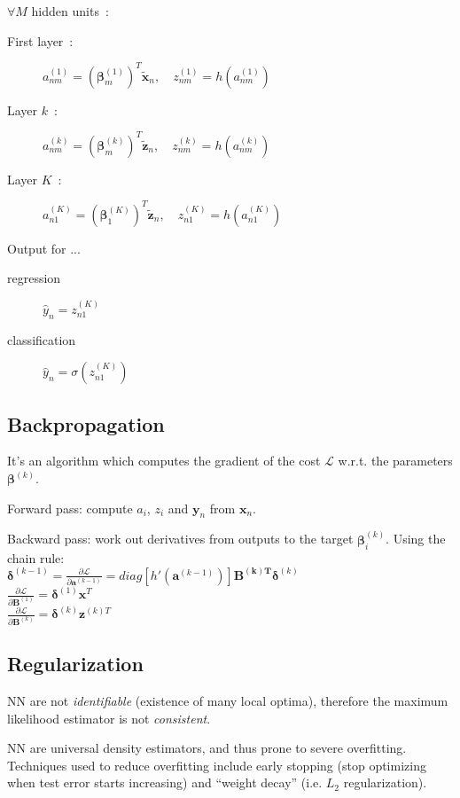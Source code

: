 \documentclass[10pt,a4paper,landscape]{article}
\renewcommand{\bf}[1]{\ensuremath{\mathbf{#1}}}
\newcommand{\bbeta}{\boldsymbol\beta}
\newcommand{\bdelta}{\boldsymbol\delta}
\begin{document}
\begin{multicols*}{4}
$\forall M$ hidden units~:
\begin{description}
\item[First layer~:] $a_{nm}^{(1)} = (\bbeta_m^{(1)})^T\tilde{\bf{x}}_n, \quad z_{nm}^{(1)} = h(a_{nm}^{(1)})$
\item[Layer $k$~:] $a_{nm}^{(k)} = (\bbeta_m^{(k)})^T\tilde{\bf{z}}_n, \quad z_{nm}^{(k)} = h(a_{nm}^{(k)})$
\item[Layer $K$~:] $a_{n1}^{(K)} = (\bbeta_1^{(K)})^T\tilde{\bf{z}}_n, \quad z_{n1}^{(K)} = h(a_{n1}^{(K)})$
\end{description}
Output for ...
\begin{description}
\item[regression] $\hat{y}_n = z_{n1}^{(K)}$
\item[classification] $\hat{y}_n = \sigma(z_{n1}^{(K)})$
\end{description}


\subsection{Backpropagation}
It's an algorithm which computes the gradient of the cost $\mathcal{L}$ w.r.t. the parameters $\bbeta^{(k)}$.

Forward pass: compute $a_i$, $z_i$ and $\bf{y}_n$ from $\bf{x}_n$.

Backward pass: work out derivatives from outputs to the target $\bbeta_i^{(k)}$. Using the chain rule:\\
$\bdelta^{(k-1)} = \frac{\partial \mathcal{L}}{\partial \bf{a}^{(k-1)}} = diag[ h'(\bf{a}^{(k-1)}) ] \bf{B^{(k)T}} \bdelta^{(k)}$\\
$\frac{\partial \mathcal{L}}{\partial \bf{B}^{(1)}} = \bdelta^{(1)} \bf{x}^T$\\
$\frac{\partial \mathcal{L}}{\partial \bf{B}^{(k)}} = \bdelta^{(k)} \bf{z}^{(k)T}$

\subsection{Regularization}
NN are not \textit{identifiable} (existence of many local optima), therefore the maximum likelihood estimator is not \textit{consistent}.

NN are universal density estimators, and thus prone to severe overfitting. Techniques used to reduce overfitting include early stopping (stop optimizing when test error starts increasing) and ``weight decay'' (i.e. $L_2$ regularization).


\end{multicols*}
\end{document}
